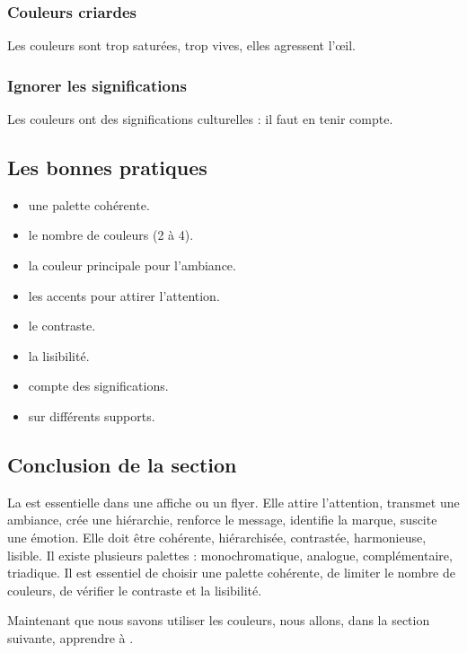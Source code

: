 \subsubsection{Couleurs criardes}

Les couleurs sont trop saturées, trop vives, elles agressent l'œil.

\subsubsection{Ignorer les significations}

Les couleurs ont des significations culturelles : il faut en tenir compte.

\subsection{Les bonnes pratiques}

\begin{itemize}
    \item {} une palette cohérente.
    \item {} le nombre de couleurs (2 à 4).
    \item {} la couleur principale pour l'ambiance.
    \item {} les accents pour attirer l'attention.
    \item {} le contraste.
    \item {} la lisibilité.
    \item {} compte des significations.
    \item {} sur différents supports.
\end{itemize}

\subsection*{Conclusion de la section}

La  est essentielle dans une affiche ou un flyer. Elle attire l'attention, transmet une ambiance, crée une hiérarchie, renforce le message, identifie la marque, suscite une émotion. Elle doit être cohérente, hiérarchisée, contrastée, harmonieuse, lisible. Il existe plusieurs palettes : monochromatique, analogue, complémentaire, triadique. Il est essentiel de choisir une palette cohérente, de limiter le nombre de couleurs, de vérifier le contraste et la lisibilité.

Maintenant que nous savons utiliser les couleurs, nous allons, dans la section suivante, apprendre à .

